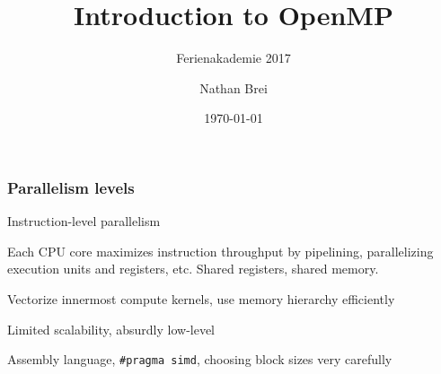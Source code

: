 \documentclass[]{beamer}
\title{Introduction to OpenMP}
\subtitle{Ferienakademie 2017}
\author{Nathan Brei}
\institute{Technical University of Munich}
\date\today
\begin{document}
\begin{frame}
  \titlepage
\end{frame}



\begin{frame}
  \frametitle{Parallelism levels}
  \begin{block}{Instruction-level parallelism}
    \begin{description}[Disadvantages]
    \item[Description] Each CPU core maximizes instruction throughput by pipelining, parallelizing execution units and registers, etc. Shared registers, shared memory.
    \item[Advantages] Vectorize innermost compute kernels, use memory hierarchy efficiently
    \item[Disadvantages] Limited scalability, absurdly low-level
    \item[Examples] Assembly language, \texttt{\#pragma simd}, choosing block sizes very carefully
    \end{description}
  \end{block}
\end{frame}
\end{document}
